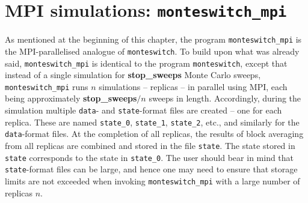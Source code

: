 \documentclass{report}
\begin{document}
\section{MPI simulations: \texttt{monteswitch\_mpi}}\label{sec:monteswitch_mpi}
As mentioned at the beginning of this chapter, the program \texttt{monteswitch\_mpi} is the MPI-parallelised analogue of \texttt{monteswitch}. 
To build upon what was already said, \texttt{monteswitch\_mpi} is identical to the program \texttt{monteswitch}, except that instead of a 
single simulation for \textbf{stop\_sweeps} Monte Carlo sweeps, \texttt{monteswitch\_mpi} runs $n$ simulations -- replicas -- in parallel using MPI, 
each being approximately \textbf{stop\_sweeps}$/n$ sweeps in length. Accordingly, during the simulation multiple \texttt{data}- and \texttt{state}-format 
files are created -- one for each replica. These are named \texttt{state\_0}, \texttt{state\_1}, \texttt{state\_2}, etc., and similarly for the 
\texttt{data}-format files. At the completion of all replicas, the results of block averaging from all replicas are combined and stored in the file 
\texttt{state}. The state stored in \texttt{state} corresponds to the state in \texttt{state\_0}. 
The user should bear in mind that \texttt{state}-format files can be large, and hence one may need to ensure that storage limits are not exceeded when
invoking \texttt{monteswitch\_mpi} with a large number of replicas $n$.
\end{document}
